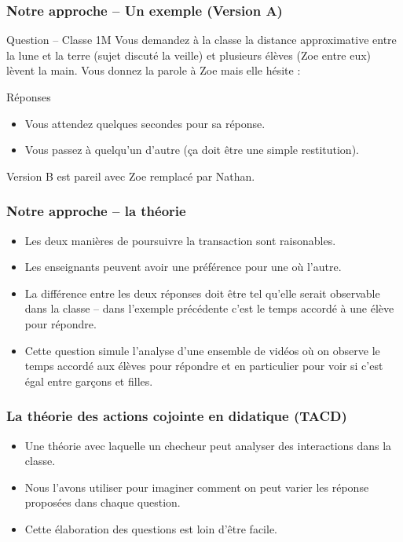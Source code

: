 \documentclass{beamer}
\begin{document}
\begin{frame}
\frametitle{Notre approche -- Un exemple (Version A)}
\begin{block}{Question – Classe 1M}
Vous demandez à la classe la distance approximative entre la lune et la terre (sujet discuté la veille) et plusieurs élèves (Zoe entre eux) lèvent la main. Vous donnez la parole à Zoe mais elle hésite :
\end{block}

\begin{block}{Réponses}
\begin{itemize}
\item Vous attendez quelques secondes pour sa réponse.
\item Vous passez à quelqu’un d’autre (ça doit être une simple restitution).
\end{itemize}
\end{block}

Version B est pareil avec Zoe remplacé par Nathan.
\end{frame}

\begin{frame}
\frametitle{Notre approche -- la théorie}
\begin{itemize}
\item Les deux manières de poursuivre la transaction sont raisonables.
\item Les enseignants peuvent avoir une préférence pour une où l'autre.
\item La différence entre les deux réponses doit être tel qu'elle serait
  observable dans la classe -- dans l'exemple précédente c'est le temps
  accordé à une élève pour répondre.
\item Cette question simule l'analyse d'une ensemble de vidéos où on
  observe le temps accordé aux élèves pour répondre et en particulier
  pour voir si c'est égal entre garçons et filles.
\end{itemize}
\end{frame}

\begin{frame}
  \frametitle{La théorie des actions cojointe en didatique (TACD)}
  \begin{itemize}
    \item Une théorie avec laquelle un checheur peut analyser des interactions
      dans la classe.
    \item Nous l'avons utiliser pour imaginer comment on peut varier
      les réponse proposées dans chaque question.
      \item Cette élaboration des questions est loin d'être facile.
    \end{itemize}
\end{frame}
\end{document}
